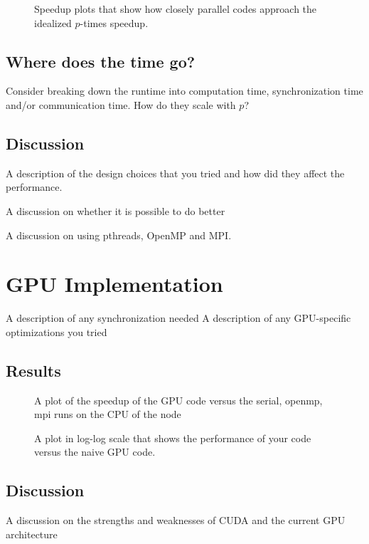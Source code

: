 \documentclass[12pt]{article}
\begin{document}
\begin{figure}
  \caption{Speedup plots that show how closely parallel codes approach the idealized $p$-times speedup.}
  \label{fig:speedup}
\end{figure}

\subsection{Where does the time go?}
Consider breaking down the runtime into computation time, synchronization time and/or communication time. How do they scale with $p$?

\subsection{Discussion}

A description of the design choices that you tried and how did they affect the performance.

A discussion on whether it is possible to do better

A discussion on using pthreads, OpenMP and MPI.

\section{GPU Implementation} \label{GPU}

A description of any synchronization needed
A description of any GPU-specific optimizations you tried

\subsection{Results}

\begin{figure}
  \caption{A plot of the speedup of the GPU code versus the serial, openmp, mpi runs on the CPU of the node}
  \label{fig:gpu-speedup}
\end{figure}

\begin{figure}
  \caption{A plot in log-log scale that shows the performance of your code versus the naive GPU code.}
  \label{fig:gpu-naive}
\end{figure}

\subsection{Discussion}

A discussion on the strengths and weaknesses of CUDA and the current GPU architecture


%
\end{document}
